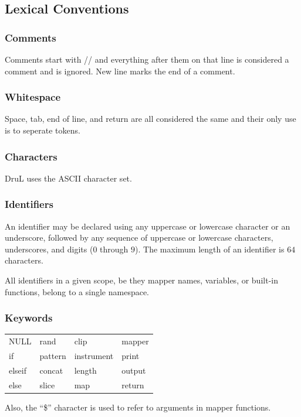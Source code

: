 \documentclass[11pt,twoside]{article}
\begin{document}
\subsection{Lexical Conventions}

\subsubsection{Comments}

Comments start with // and everything after them on that line
is considered a comment and is ignored. New line marks the end
of a comment.

\subsubsection{Whitespace}

Space, tab, end of line, and return are all considered the same 
and their only use is to seperate tokens.

\subsubsection{Characters}

DruL uses the ASCII character set.

\subsubsection{Identifiers}

An identifier may be declared using any uppercase or lowercase character
or an underscore, followed by any sequence of uppercase or lowercase characters,
underscores, and digits ($0$ through $9$). The maximum length of an identifier
is $64$ characters.

All identifiers in a given scope, be they mapper names, variables, or built-in functions, belong to a single namespace.

\subsubsection{Keywords}

\begin{table}[htb]
\begin{center} 
\begin{tabular}{llll} 
  NULL   & rand    & clip       & mapper \\
  if     & pattern & instrument & print  \\
  elseif & concat  & length     & output \\
  else   & slice   & map        & return
\end{tabular}
\label{tab:keywords}
\end{center} 
\end{table}
Also, the ``\$'' character is used to refer to arguments in mapper functions.
\end{document}
